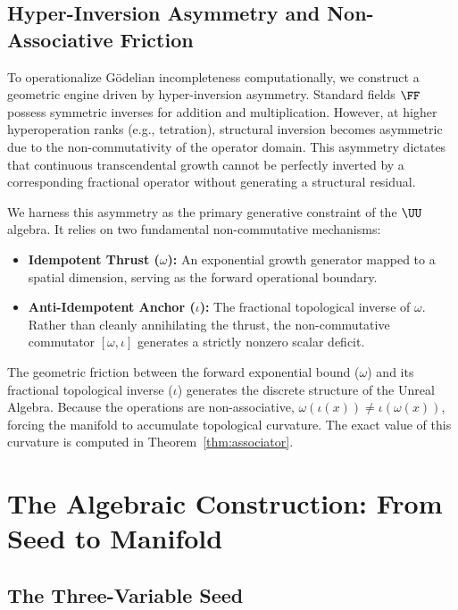 \subsection{Hyper-Inversion Asymmetry and Non-Associative Friction}

To operationalize G\"odelian incompleteness computationally, we construct a geometric engine driven by hyper-inversion asymmetry. Standard fields $\FF$ possess symmetric inverses for addition and multiplication. However, at higher hyperoperation ranks (e.g., tetration), structural inversion becomes asymmetric due to the non-commutativity of the operator domain. This asymmetry dictates that continuous transcendental growth cannot be perfectly inverted by a corresponding fractional operator without generating a structural residual.

We harness this asymmetry as the primary generative constraint of the $\UU$ algebra. It relies on two fundamental non-commutative mechanisms:
\begin{itemize}
\item \textbf{Idempotent Thrust ($\omega$):} An exponential growth generator mapped to a spatial dimension, serving as the forward operational boundary.
\item \textbf{Anti-Idempotent Anchor ($\iota$):} The fractional topological inverse of $\omega$. Rather than cleanly annihilating the thrust, the non-commutative commutator $[\omega, \iota]$ generates a strictly nonzero scalar deficit.
\end{itemize}

The geometric friction between the forward exponential bound ($\omega$) and its fractional topological inverse ($\iota$) generates the discrete structure of the Unreal Algebra. Because the operations are non-associative, $\omega(\iota(x)) \neq \iota(\omega(x))$, forcing the manifold to accumulate topological curvature. The exact value of this curvature is computed in Theorem~\ref{thm:associator}.

\section{The Algebraic Construction: From Seed to Manifold}

\subsection{The Three-Variable Seed}\label{sec:seed}

